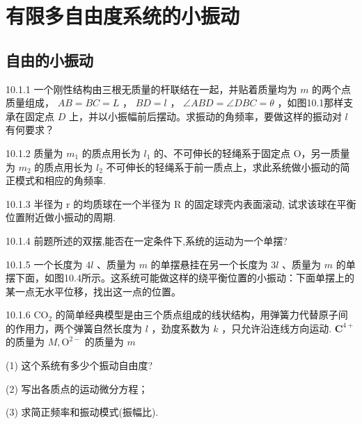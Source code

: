 \chapter{有限多自由度系统的小振动}

\section{自由的小振动}

\begin{problem}{10.1.1}
一个刚性结构由三根无质量的杆联结在一起，并贴着质量均为 $m$ 的两个点质量组成， $AB = BC = L$ ， $BD = l$ ， $\angle ABD = \angle DBC = \theta$ ，如图10.1那样支承在固定点 $D$ 上，并以小振幅前后摆动。求振动的角频率，要做这样的振动对 $l$ 有何要求？
\begin{center}

\end{center}
\end{problem}
\clearpage


\begin{problem}{10.1.2}
质量为 $m_{1}$ 的质点用长为 $l_{1}$ 的、不可伸长的轻绳系于固定点 O，另一质量为 $m_{2}$ 的质点用长为 $l_{2}$ 不可伸长的轻绳系于前一质点上，求此系统做小振动的简正模式和相应的角频率.
\end{problem}
\clearpage


\begin{problem}{10.1.3}
半径为 r 的均质球在一个半径为 R 的固定球壳内表面滚动, 试求该球在平衡位置附近做小振动的周期.
\end{problem}
\clearpage


\begin{problem}{10.1.4}
前题所述的双摆,能否在一定条件下,系统的运动为一个单摆?
\end{problem}
\clearpage


\begin{problem}{10.1.5}
一个长度为 $4l$ 、质量为 $m$ 的单摆悬挂在另一个长度为 $3l$ 、质量为 $m$ 的单摆下面，如图10.4所示。这系统可能做这样的绕平衡位置的小振动：下面单摆上的某一点无水平位移，找出这一点的位置。
\begin{center}

\end{center}
\end{problem}
\clearpage


\begin{problem}{10.1.6}
$\mathrm{CO}_{2}$ 的简单经典模型是由三个质点组成的线状结构，用弹簧力代替原子间的作用力，两个弹簧自然长度为 $l$ ，劲度系数为 $k$ ，只允许沿连线方向运动. $\mathbf{C}^{4+}$ 的质量为 $M,\mathrm{O}^{2-}$ 的质量为 $m$ 

(1) 这个系统有多少个振动自由度?

(2) 写出各质点的运动微分方程；

(3) 求简正频率和振动模式(振幅比).
\end{problem}
\clearpage


